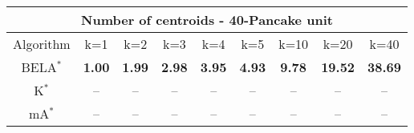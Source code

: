 \begin{tabular}{c|cccccccc}\toprule
\multicolumn{9}{c}{Number of centroids - 40-Pancake unit}\\ \midrule
Algorithm & k=1 & k=2 & k=3 & k=4 & k=5 & k=10 & k=20 & k=40 \\ \midrule
BELA$^*$ & \textbf{1.00} & \textbf{1.99} & \textbf{2.98} & \textbf{3.95} & \textbf{4.93} & \textbf{9.78} & \textbf{19.52} & \textbf{38.69} \\
K$^*$ & -- & -- & -- & -- & -- & -- & -- & -- \\
mA$^*$ & -- & -- & -- & -- & -- & -- & -- & -- \\ \bottomrule 
\end{tabular}
